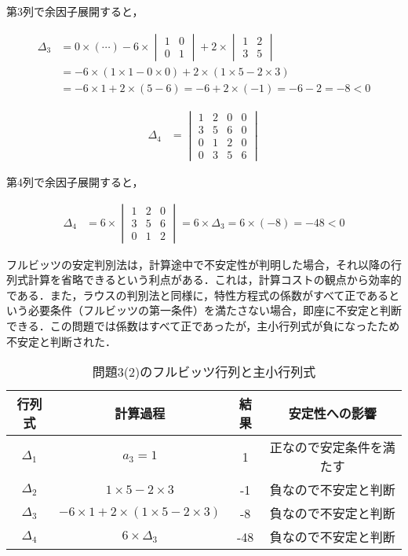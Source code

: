 \documentclass[11pt,a4paper]{ltjsarticle}
\begin{document}
第3列で余因子展開すると，

\begin{align}
\Delta_3 &= 0 \times (\cdots) - 6 \times \begin{vmatrix}
1 & 0 \\
0 & 1
\end{vmatrix} + 2 \times \begin{vmatrix}
1 & 2 \\
3 & 5
\end{vmatrix} \\
&= -6 \times (1 \times 1 - 0 \times 0) + 2 \times (1 \times 5 - 2 \times 3) \\
&= -6 \times 1 + 2 \times (5 - 6) = -6 + 2 \times (-1) = -6 - 2 = -8 < 0
\end{align}

\begin{align}
\Delta_4 &= \begin{vmatrix}
1 & 2 & 0 & 0 \\
3 & 5 & 6 & 0 \\
0 & 1 & 2 & 0 \\
0 & 3 & 5 & 6
\end{vmatrix}
\end{align}

第4列で余因子展開すると，

\begin{align}
\Delta_4 &= 6 \times \begin{vmatrix}
1 & 2 & 0 \\
3 & 5 & 6 \\
0 & 1 & 2
\end{vmatrix} = 6 \times \Delta_3 = 6 \times (-8) = -48 < 0
\end{align}

フルビッツの安定判別法は，計算途中で不安定性が判明した場合，それ以降の行列式計算を省略できるという利点がある．これは，計算コストの観点から効率的である．また，ラウスの判別法と同様に，特性方程式の係数がすべて正であるという必要条件（フルビッツの第一条件）を満たさない場合，即座に不安定と判断できる．この問題では係数はすべて正であったが，主小行列式が負になったため不安定と判断された．

\begin{table}[h]
\centering
\caption{問題3(2)のフルビッツ行列と主小行列式}
\label{tbl:hurwitz2}
\begin{tabular}{cccc}
\toprule
行列式 & 計算過程 & 結果 & 安定性への影響 \\
\midrule
$\Delta_1$ & $a_3 = 1$ & 1 & 正なので安定条件を満たす \\
$\Delta_2$ & $1 \times 5 - 2 \times 3$ & -1 & 負なので不安定と判断 \\
$\Delta_3$ & $-6 \times 1 + 2 \times (1 \times 5 - 2 \times 3)$ & -8 & 負なので不安定と判断 \\
$\Delta_4$ & $6 \times \Delta_3$ & -48 & 負なので不安定と判断 \\
\bottomrule
\end{tabular}
\end{table}
\end{document}
